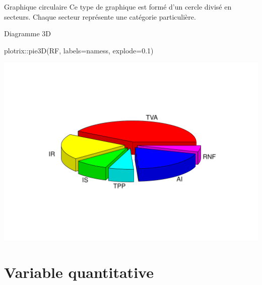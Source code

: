 \documentclass[
  8pt,
  ignorenonframetext,
]{beamer}
\newenvironment{Shaded}{\begin{snugshade}}{\end{snugshade}}
\newcommand{\AttributeTok}[1]{\textcolor[rgb]{0.77,0.63,0.00}{#1}}
\newcommand{\FloatTok}[1]{\textcolor[rgb]{0.00,0.00,0.81}{#1}}
\newcommand{\FunctionTok}[1]{\textcolor[rgb]{0.00,0.00,0.00}{#1}}
\newcommand{\NormalTok}[1]{#1}
\newcommand{\SpecialCharTok}[1]{\textcolor[rgb]{0.00,0.00,0.00}{#1}}
\begin{document}
\begin{frame}[fragile]{Graphique circulaire}
\protect\hypertarget{graphique-circulaire-1}{}
Ce type de graphique est formé d'un cercle divisé en secteurs. Chaque
secteur représente une catégorie particulière.

\begin{block}{Diagramme 3D}
\protect\hypertarget{diagramme-3d}{}
\begin{Shaded}
\begin{Highlighting}[]
\NormalTok{plotrix}\SpecialCharTok{::}\FunctionTok{pie3D}\NormalTok{(RF, }\AttributeTok{labels=}\NormalTok{namess, }\AttributeTok{explode=}\FloatTok{0.1}\NormalTok{)}
\end{Highlighting}
\end{Shaded}

\begin{center}\includegraphics[width=0.8\linewidth]{Chap2_R_files/figure-beamer/unnamed-chunk-19-1} \end{center}
\end{block}
\end{frame}

\hypertarget{variable-quantitative}{%
\section{Variable quantitative}\label{variable-quantitative}}
\end{document}
